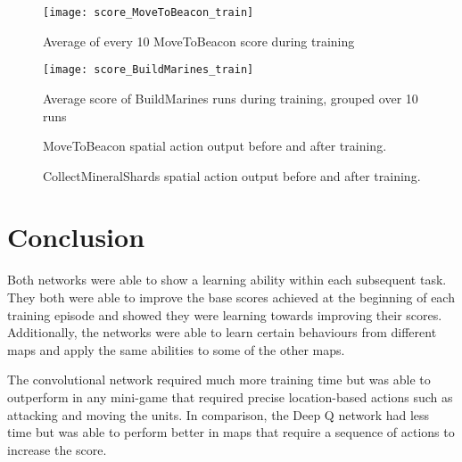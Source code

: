\begin{figure}[h]
  \centering
  \begin{minipage}[b]{0.45\textwidth}
    \texttt{[image: score\_MoveToBeacon\_train]}
    \caption{Average of every 10 MoveToBeacon score during training}%
    \label{fig:dqn-scores-1}%
  \end{minipage}
  \hfill
  \begin{minipage}[b]{0.45\textwidth}
    \texttt{[image: score\_BuildMarines\_train]}
    \caption{Average score of BuildMarines runs during training, grouped over 10
    runs}%
    \label{fig:dqn-scores-2}
  \end{minipage}
\end{figure}

\begin{figure}[h]
    \centering
    \caption{MoveToBeacon spatial action output before and after training.}%
    \label{fig:cnn-filter1}%
\end{figure}

\begin{figure}[h]
    \centering
    \caption{CollectMineralShards spatial action output before and after training.}%
    \label{fig:cnn-filter2}%
\end{figure}

\section{Conclusion}

Both networks were able to show a learning ability within each subsequent task.
They both were able to improve the base scores achieved at the beginning of
each training episode and showed they were learning towards improving their
scores. Additionally, the networks were able to learn certain behaviours from
different maps and apply the same abilities to some of the other maps.

The convolutional network required much more training time but was able to
outperform in any mini-game that required precise location-based actions such as
attacking and moving the units. In comparison, the Deep Q network had less time
but was able to perform better in maps that require a sequence of actions to
increase the score.

